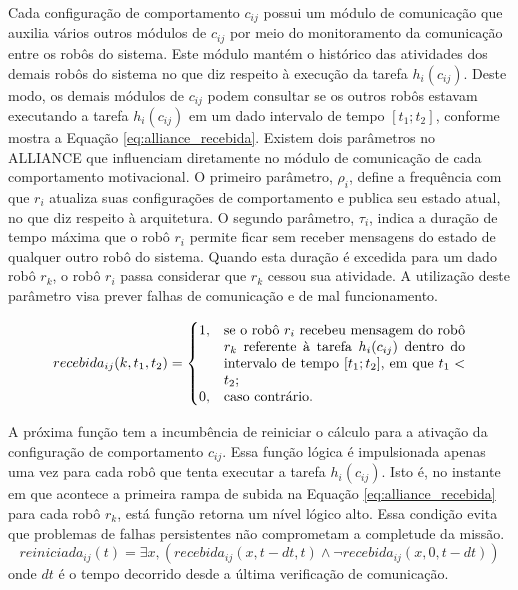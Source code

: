             Cada configuração de comportamento $c_{ij}$ possui um módulo de comunicação que auxilia vários outros módulos de $c_{ij}$ por meio do monitoramento da comunicação entre os robôs do sistema. Este módulo mantém o histórico das atividades dos demais robôs do sistema no que diz respeito à execução da tarefa $h_i(c_{ij})$. Deste modo, os demais módulos de $c_{ij}$ podem consultar se os outros robôs estavam executando a tarefa $h_i(c_{ij})$ em um dado intervalo de tempo $[t_1; t_2]$, conforme mostra a Equação \ref{eq:alliance_recebida}. Existem dois parâmetros no ALLIANCE que influenciam diretamente no módulo de comunicação de cada comportamento motivacional. O primeiro parâmetro, $\rho_i$, define a frequência com que $r_i$ atualiza suas configurações de comportamento e publica seu estado atual, no que diz respeito à arquitetura. O segundo parâmetro, $\tau_i$, indica a duração de tempo máxima que o robô $r_i$ permite ficar sem receber mensagens do estado de qualquer outro robô do sistema. Quando esta duração é excedida para um dado robô $r_k$, o robô $r_i$ passa considerar que $r_k$ cessou sua atividade. A utilização deste parâmetro visa prever falhas de comunicação e de mal funcionamento.
            
            \begin{equation} \label{eq:alliance_recebida}
                recebida_{ij}(k, t_1, t_2) =
                \begin{cases}
                    1, & \parbox[t]{.5\textwidth}{se o robô $r_i$ recebeu mensagem do robô $r_k$ referente à tarefa $h_i(c_{ij})$ dentro do intervalo de tempo $[t_1; t_2]$, em que $t_1 < t_2$;} \\
                    0, & \text{caso contrário.}
                \end{cases}
            \end{equation}
            
            A próxima função tem a incumbência de reiniciar o cálculo para a ativação da configuração de comportamento $c_{ij}$. Essa função lógica é impulsionada apenas uma vez para cada robô que tenta executar a tarefa $h_i(c_{ij})$. Isto é, no instante em que acontece a primeira rampa de subida na Equação \ref{eq:alliance_recebida} para cada robô $r_k$, está função retorna um nível lógico alto. Essa condição evita que problemas de falhas persistentes não comprometam a completude da missão.
            \begin{equation} \label{eq:alliance_reiniciada}
                reiniciada_{ij}(t) = \exists x, (recebida_{ij}(x, t - dt, t) \land \lnot recebida_{ij}(x, 0, t - dt))
            \end{equation}
            onde $dt$ é o tempo decorrido desde a última verificação de comunicação.
            
